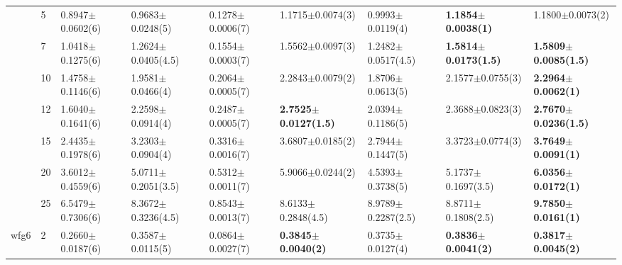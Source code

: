\begin{table*}[]
\begin{adjustbox}{width=1.0\textwidth,center}
\begin{tabular}{lllllllll}
      & 5                              & 0.8947$\pm$0.0602(6)         & 0.9683$\pm$0.0248(5)          & 0.1278$\pm$0.0006(7)              & 1.1715$\pm$0.0074(3)                              & 0.9993$\pm$0.0119(4)                     & \textbf{1.1854$\pm$0.0038(1)}              & 1.1800$\pm$0.0073(2)            \\
      & 7                              & 1.0418$\pm$0.1275(6)         & 1.2624$\pm$0.0405(4.5)        & 0.1554$\pm$0.0003(7)              & 1.5562$\pm$0.0097(3)                              & 1.2482$\pm$0.0517(4.5)                   & \textbf{1.5814$\pm$0.0173(1.5)}            & \textbf{1.5809$\pm$0.0085(1.5)} \\
      & 10                             & 1.4758$\pm$0.1146(6)         & 1.9581$\pm$0.0466(4)          & 0.2064$\pm$0.0005(7)              & 2.2843$\pm$0.0079(2)                              & 1.8706$\pm$0.0613(5)                     & 2.1577$\pm$0.0755(3)                       & \textbf{2.2964$\pm$0.0062(1)}   \\
      & 12                             & 1.6040$\pm$0.1641(6)         & 2.2598$\pm$0.0914(4)          & 0.2487$\pm$0.0005(7)              & \textbf{2.7525$\pm$0.0127(1.5)}                   & 2.0394$\pm$0.1186(5)                     & 2.3688$\pm$0.0823(3)                       & \textbf{2.7670$\pm$0.0236(1.5)} \\
      & 15                             & 2.4435$\pm$0.1978(6)         & 3.2303$\pm$0.0904(4)          & 0.3316$\pm$0.0016(7)              & 3.6807$\pm$0.0185(2)                              & 2.7944$\pm$0.1447(5)                     & 3.3723$\pm$0.0774(3)                       & \textbf{3.7649$\pm$0.0091(1)}   \\
      & 20                             & 3.6012$\pm$0.4559(6)         & 5.0711$\pm$0.2051(3.5)        & 0.5312$\pm$0.0011(7)              & 5.9066$\pm$0.0244(2)                              & 4.5393$\pm$0.3738(5)                     & 5.1737$\pm$0.1697(3.5)                     & \textbf{6.0356$\pm$0.0172(1)}   \\
      & 25                             & 6.5479$\pm$0.7306(6)         & 8.3672$\pm$0.3236(4.5)        & 0.8543$\pm$0.0013(7)              & 8.6133$\pm$0.2848(4.5)                            & 8.9789$\pm$0.2287(2.5)                   & 8.8711$\pm$0.1808(2.5)                     & \textbf{9.7850$\pm$0.0161(1)}   \\\thickhline
wfg6  & 2                              & 0.2660$\pm$0.0187(6)         & 0.3587$\pm$0.0115(5)          & 0.0864$\pm$0.0027(7)              & \textbf{0.3845$\pm$0.0040(2)}                     & 0.3735$\pm$0.0127(4)                     & \textbf{0.3836$\pm$0.0041(2)}              & \textbf{0.3817$\pm$0.0045(2)}   \\

\end{tabular}
\end{adjustbox}
\end{table*}
